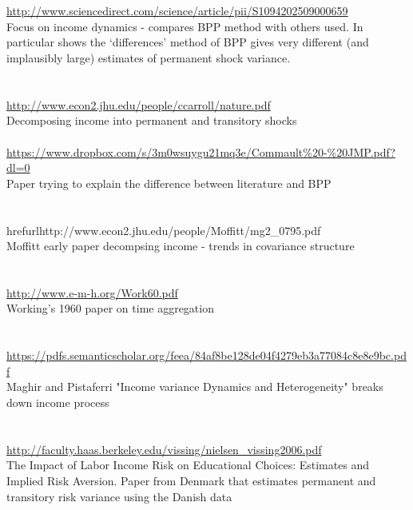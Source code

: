 \documentclass[titlepage,abstract]{econtex}
\begin{document}
\\
\cite{heathcote_unequal_2010} \\
\href{url}{http://www.sciencedirect.com/science/article/pii/S1094202509000659} \\
Focus on income dynamics - compares BPP method with others used. In particular shows the `differences' method of BPP gives very different (and implausibly large) estimates of permanent shock variance.\\
\\
\cite{carroll_nature_1997} \\
\href{url}{http://www.econ2.jhu.edu/people/ccarroll/nature.pdf} \\
Decomposing income into permanent and transitory shocks \\
\\
\cite{commault_how_2017}
\href{url}{https://www.dropbox.com/s/3m0wsuygu21mq3e/Commault\%20-\%20JMP.pdf?dl=0} \\
Paper trying to explain the difference between literature and BPP\\
\\
\cite{moffitt_trends_2012} \\
href{url}{http://www.econ2.jhu.edu/people/Moffitt/mg2\_0795.pdf} \\
Moffitt early paper decompsing income - trends in covariance structure\\
\\
\cite{working_note_1960} \\
\href{url}{http://www.e-m-h.org/Work60.pdf} \\
Working's 1960 paper on time aggregation\\
\\
\cite{meghir_income_2004} \\
\href{url}{https://pdfs.semanticscholar.org/feea/84af8be128de04f4279eb3a77084c8e8e9bc.pdf} \\
Maghir and Pistaferri "Income variance Dynamics and Heterogeneity" breaks down income process\\
\\
\cite{nielsen_impact_2004} \\
\href{url}{http://faculty.haas.berkeley.edu/vissing/nielsen\_vissing2006.pdf} \\
The Impact of Labor Income Risk on Educational Choices: Estimates and Implied Risk Aversion. Paper from Denmark that estimates permanent and transitory risk variance using the Danish data\\
\\
\end{document}
